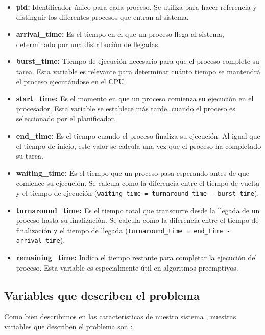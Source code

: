 \documentclass[12pt]{article}
\begin{document}
\begin{itemize}
	\item \textbf{pid:} Identificador único para cada proceso. Se utiliza para hacer referencia y distinguir los diferentes procesos que entran al sistema.
	\item \textbf{arrival\_time:} Es el tiempo en el que un proceso llega al sistema, determinado por una distribución de llegadas.
	\item \textbf{burst\_time:} Tiempo de ejecución necesario para que el proceso complete su tarea. Esta variable es relevante para determinar cuánto tiempo se mantendrá el proceso ejecutándose en el CPU.
	\item \textbf{start\_time:} Es el momento en que un proceso comienza su ejecución en el procesador. Esta variable se establece más tarde, cuando el proceso es seleccionado por el planificador.
	\item \textbf{end\_time:} Es el tiempo cuando el proceso finaliza su ejecución. Al igual que el tiempo de inicio, este valor se calcula una vez que el proceso ha completado su tarea.
	\item \textbf{waiting\_time:} Es el tiempo que un proceso pasa esperando antes de que comience su ejecución. Se calcula como la diferencia entre el tiempo de vuelta y el tiempo de ejecución (\texttt{waiting\_time = turnaround\_time - burst\_time}).
	
	\item \textbf{turnaround\_time:} Es el tiempo total que transcurre desde la llegada de un proceso hasta su finalización. Se calcula como la diferencia entre el tiempo de finalización y el tiempo de llegada (\texttt{turnaround\_time = end\_time - arrival\_time}).
	
	\item \textbf{remaining\_time:} Indica el tiempo restante para completar la ejecución del proceso. Esta variable es especialmente útil en algoritmos preemptivos.
	
\end{itemize}

\subsection{Variables que describen el problema}
Como bien describimos en las caracteristicas de nuestro sistema , nuestras variables que describen el problema son :
\end{document}
